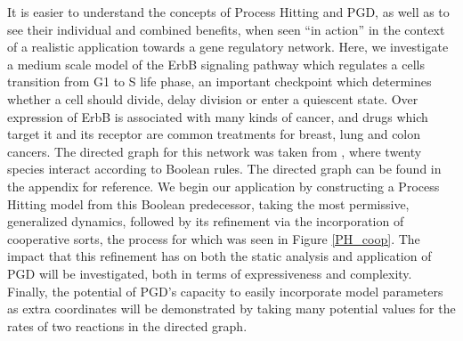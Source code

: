 \documentclass{article}
\begin{document}
It is easier to understand the concepts of Process Hitting and PGD, as well as to see their individual and combined benefits, when seen ``in action'' in the context of a realistic application towards a gene regulatory network. Here, we investigate a medium scale model of the ErbB signaling pathway which regulates a cells transition from G1 to S life phase, an important checkpoint which determines whether a cell should divide, delay division or enter a quiescent state. Over expression of ErbB is associated with many kinds of cancer, and drugs which target it and its receptor are common treatments for breast, lung and colon cancers. The directed graph for this network was taken from \cite{Sahin09}, where twenty species interact according to Boolean rules. The directed graph can be found in the appendix for reference. We begin our application by constructing a Process Hitting model from this Boolean predecessor, taking the most permissive, generalized dynamics, followed by its refinement via the incorporation of cooperative sorts, the process for which was seen in Figure \ref{PH_coop}. The impact that this refinement has on both the static analysis and application of PGD will be investigated, both in terms of expressiveness and complexity. Finally, the potential of PGD's capacity to easily incorporate model parameters as extra coordinates will be demonstrated by taking many potential values for the rates of two reactions in the directed graph.\\
\end{document}

